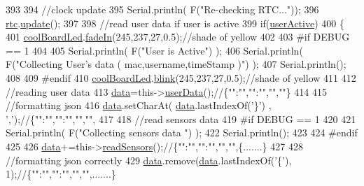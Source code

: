 \begin{DoxyCode}
393 
394     \textcolor{comment}{//clock update}
395     Serial.println( F(\textcolor{stringliteral}{"Re-checking RTC..."}));
396     \hyperlink{class_cool_board_a50d2a6716879d64a85f3c6b44ad63275}{rtc}.\hyperlink{class_cool_time_aae601f795452cfa48d9fb337aed483a8}{update}();
397 
398     \textcolor{comment}{//read user data if user is active}
399     \textcolor{keywordflow}{if}(\hyperlink{class_cool_board_a6395459131d6889a3005f79c7a35e964}{userActive})
400     \{
401         \hyperlink{class_cool_board_a1b1d3c684a5baa56b08486e192fd8e97}{coolBoardLed}.\hyperlink{class_cool_board_led_ab778f5e7bed0ab74e3906d82110493c3}{fadeIn}(245,237,27,0.5);\textcolor{comment}{//shade of yellow}
402     
403 \textcolor{preprocessor}{    #if DEBUG == 1}
404 
405         Serial.println( F(\textcolor{stringliteral}{"User is Active"}) );
406         Serial.println( F(\textcolor{stringliteral}{"Collecting User's data ( mac,username,timeStamp )"}) );
407         Serial.println();
408     
409 \textcolor{preprocessor}{    #endif  }
410         \hyperlink{class_cool_board_a1b1d3c684a5baa56b08486e192fd8e97}{coolBoardLed}.\hyperlink{class_cool_board_led_a96e1ea13003eee34c9dbcef340404426}{blink}(245,237,27,0.5);\textcolor{comment}{//shade of yellow   }
411 
412         \textcolor{comment}{//reading user data}
413         \hyperlink{class_cool_board_a427fb753dd8575bdf821c70a5c63d695}{data}=this->\hyperlink{class_cool_board_ae7358fb6e623cfc81b775f5f1734909b}{userData}();\textcolor{comment}{//\{"":"","":"","",""\}}
414 
415         \textcolor{comment}{//formatting json }
416         \hyperlink{class_cool_board_a427fb753dd8575bdf821c70a5c63d695}{data}.setCharAt( \hyperlink{class_cool_board_a427fb753dd8575bdf821c70a5c63d695}{data}.lastIndexOf(\textcolor{charliteral}{'\}'}) , \textcolor{charliteral}{','});\textcolor{comment}{//\{"":"","":"","","",}
417                 
418         \textcolor{comment}{//read sensors data}
419 \textcolor{preprocessor}{    #if DEBUG == 1}
420 
421         Serial.println( F(\textcolor{stringliteral}{"Collecting sensors data "}) );
422         Serial.println();
423     
424 \textcolor{preprocessor}{    #endif}
425 
426         \hyperlink{class_cool_board_a427fb753dd8575bdf821c70a5c63d695}{data}+=this->\hyperlink{class_cool_board_ad03abdce2e65f520bbf2cff0f2d083cf}{readSensors}();\textcolor{comment}{//\{"":"","":"","","",\{.......\}     }
427 
428         \textcolor{comment}{//formatting json correctly}
429         \hyperlink{class_cool_board_a427fb753dd8575bdf821c70a5c63d695}{data}.remove(\hyperlink{class_cool_board_a427fb753dd8575bdf821c70a5c63d695}{data}.lastIndexOf(\textcolor{charliteral}{'\{'}), 1);\textcolor{comment}{//\{"":"","":"","","",.......\}}

\end{DoxyCode}
